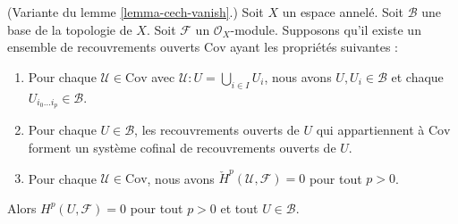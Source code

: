 \begin{lemma}

\label{lemma-cech-vanish-basis}

(Variante du lemme \ref{lemma-cech-vanish}.) Soit $X$ un espace annelé. Soit $\mathcal{B}$ une base de la topologie de $X$. Soit $\mathcal{F}$ un $\mathcal{O}_X$-module. Supposons qu'il existe un ensemble de recouvrements ouverts $\text{Cov}$
ayant les propriétés suivantes :

\begin{enumerate}

\item Pour chaque $\mathcal{U} \in \text{Cov}$
avec $\mathcal{U} : U = \bigcup_{i \in I} U_i$, nous avons
$U, U_i \in \mathcal{B}$ et chaque $U_{i_0 \ldots i_p} \in \mathcal{B}$.
\item Pour chaque $U \in \mathcal{B}$, les recouvrements ouverts de $U$
qui appartiennent à $\text{Cov}$ forment un système cofinal de recouvrements ouverts de $U$.
\item Pour chaque $\mathcal{U} \in \text{Cov}$, nous avons
$\check{H}^p(\mathcal{U}, \mathcal{F}) = 0$ pour tout $p > 0$.

\end{enumerate}

Alors $H^p(U, \mathcal{F}) = 0$ pour tout $p > 0$ et tout $U \in \mathcal{B}$.

\end{lemma}

